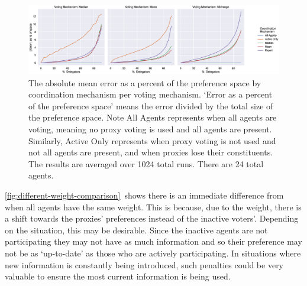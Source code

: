\begin{landscape}
    \begin{figure}[p]
        \centering
        \includegraphics[scale=0.55]
        {content/chapter2/figures/vm_col_cm_hue_error_as_percent_of_space_abs_mean}
        \caption{
            The absolute mean error as a percent of the preference space by
            coordination mechanism per voting mechanism.
            `Error as a percent of the preference space' means the error divided by
            the total size of the preference space.
            Note All Agents represents when all agents are voting, meaning no proxy
            voting is used and all agents are present.
            Similarly, Active Only represents when proxy voting is not used and not
            all agents are present, and when proxies lose their constituents.
            The results are averaged over 1024 total runs.
            There are 24 total agents.
        }
        \label{fig:vm-col-cm-hue-error-as-percent-of-space-abs-mean}
    \end{figure}
\end{landscape}

\autoref{fig:different-weight-comparison}~shows there is an immediate difference from
when all agents have the same weight.
This is because, due to the weight, there is a shift towards the proxies' preferences
instead of the inactive voters'.
Depending on the situation, this may be desirable.
Since the inactive agents are not participating they may not have as much information
and so their preference may not be as `up-to-date' as those who are actively
participating.
In situations where new information is constantly being introduced, such penalties
could be very valuable to ensure the most current information is being used.

